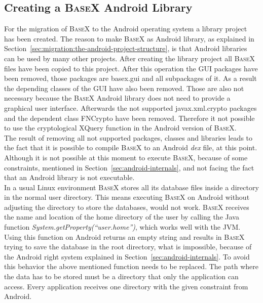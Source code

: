 \subsection{Creating a \textsc{BaseX} Android Library}
\label{sec:migration:creating-a-basex-android-library}
For the migration of \textsc{BaseX} to the Android operating system a library project has been created.
The reason to make \textsc{BaseX} as Android library, as explained in Section~\ref{sec:migration:the-android-project-structure}, is that Android libraries can be used by many other projects.
After creating the library project all \textsc{BaseX} files have been copied to this project.
After this operation the GUI packages have been removed, those packages are \textsf{basex.gui} and all subpackages of it.
As a result the depending classes of the GUI have also been removed.
Those are also not necessary because the \textsc{BaseX} Android library does not need to provide a graphical user interface.
Afterwards the not supported \textsf{javax.xml.crypto} packages and the dependent class \textsf{FNCrypto} have been removed.
Therefore it not possible to use the cryptological XQuery function in the Android version of \textsc{BaseX}.\\
The result of removing all not supported packages, classes and libraries leads to the fact that it is possible to compile \textsc{BaseX} to an Android \textit{dex} file, at this point.
Although it is not possible at this moment to execute \textsc{BaseX}, because of some constraints, mentioned in Section~\ref{sec:android-internals}, and not facing the fact that an Android library is not executable.\\
In a usual Linux environment \textsc{BaseX} stores all its database files inside a directory in the normal user directory.
This means executing \textsc{BaseX} on Android without adjusting the directory to store the databases, would not work.
\textsc{BaseX} receives the name and location of the home directory of the user by calling the Java function \textit{System.getProperty(``user.home'')}, which works well with the JVM.
Using this function on Android returns an empty string and results in \textsc{BaseX} trying to save the database in the root directory, what is impossible, because of the Android right system explained in Section~\ref{sec:android-internals}.
To avoid this behavior the above mentioned function needs to be replaced.
The path where the data has to be stored must be a directory that only the application can access.
Every application receives one directory with the given constraint from Android.
